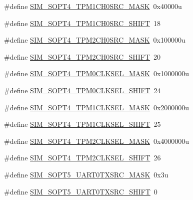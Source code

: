 \begin{DoxyCompactItemize}
\item 
\#define \hyperlink{group___s_i_m___register___masks_ga9897da591b25b25a121a2321c5515923}{S\+I\+M\+\_\+\+S\+O\+P\+T4\+\_\+\+T\+P\+M1\+C\+H0\+S\+R\+C\+\_\+\+M\+A\+SK}~0x40000u
\item 
\#define \hyperlink{group___s_i_m___register___masks_ga79b1e63028e073fbe12351561f1b7645}{S\+I\+M\+\_\+\+S\+O\+P\+T4\+\_\+\+T\+P\+M1\+C\+H0\+S\+R\+C\+\_\+\+S\+H\+I\+FT}~18
\item 
\#define \hyperlink{group___s_i_m___register___masks_ga871c6061ab30b4ad99b919e35e86c081}{S\+I\+M\+\_\+\+S\+O\+P\+T4\+\_\+\+T\+P\+M2\+C\+H0\+S\+R\+C\+\_\+\+M\+A\+SK}~0x100000u
\item 
\#define \hyperlink{group___s_i_m___register___masks_ga85ccc239517b7633b2c0a164b8d5cbf3}{S\+I\+M\+\_\+\+S\+O\+P\+T4\+\_\+\+T\+P\+M2\+C\+H0\+S\+R\+C\+\_\+\+S\+H\+I\+FT}~20
\item 
\#define \hyperlink{group___s_i_m___register___masks_gae889ccb89e5c139f002b6a62d21628a9}{S\+I\+M\+\_\+\+S\+O\+P\+T4\+\_\+\+T\+P\+M0\+C\+L\+K\+S\+E\+L\+\_\+\+M\+A\+SK}~0x1000000u
\item 
\#define \hyperlink{group___s_i_m___register___masks_ga608eeddec48cf22911d5f5a1ea52c261}{S\+I\+M\+\_\+\+S\+O\+P\+T4\+\_\+\+T\+P\+M0\+C\+L\+K\+S\+E\+L\+\_\+\+S\+H\+I\+FT}~24
\item 
\#define \hyperlink{group___s_i_m___register___masks_ga049c795a05cfcabb4865bd94e9960d1c}{S\+I\+M\+\_\+\+S\+O\+P\+T4\+\_\+\+T\+P\+M1\+C\+L\+K\+S\+E\+L\+\_\+\+M\+A\+SK}~0x2000000u
\item 
\#define \hyperlink{group___s_i_m___register___masks_gae2f48392a848aa2b9dd0f4f117682ff1}{S\+I\+M\+\_\+\+S\+O\+P\+T4\+\_\+\+T\+P\+M1\+C\+L\+K\+S\+E\+L\+\_\+\+S\+H\+I\+FT}~25
\item 
\#define \hyperlink{group___s_i_m___register___masks_gad5a902a0614ee968bf5f4e8b4d619631}{S\+I\+M\+\_\+\+S\+O\+P\+T4\+\_\+\+T\+P\+M2\+C\+L\+K\+S\+E\+L\+\_\+\+M\+A\+SK}~0x4000000u
\item 
\#define \hyperlink{group___s_i_m___register___masks_ga7e0e458665aad403b0a67a515fa08ff3}{S\+I\+M\+\_\+\+S\+O\+P\+T4\+\_\+\+T\+P\+M2\+C\+L\+K\+S\+E\+L\+\_\+\+S\+H\+I\+FT}~26
\item 
\#define \hyperlink{group___s_i_m___register___masks_ga11646c1292cb7aab3128e1e563847e32}{S\+I\+M\+\_\+\+S\+O\+P\+T5\+\_\+\+U\+A\+R\+T0\+T\+X\+S\+R\+C\+\_\+\+M\+A\+SK}~0x3u
\item 
\#define \hyperlink{group___s_i_m___register___masks_ga0220b88df4a0747579d24b77f4db4e67}{S\+I\+M\+\_\+\+S\+O\+P\+T5\+\_\+\+U\+A\+R\+T0\+T\+X\+S\+R\+C\+\_\+\+S\+H\+I\+FT}~0

\end{DoxyCompactItemize}
